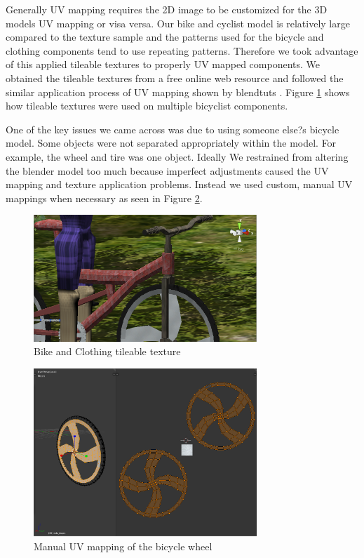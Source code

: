 \documentclass{scrartcl}
\begin{document}
Generally UV mapping requires the 2D image to be customized for the 3D models UV mapping or visa versa.  Our bike and cyclist model is relatively large compared to the texture sample and the patterns used for the bicycle and clothing components tend to use repeating patterns.  Therefore we took advantage of this applied tileable textures to properly UV mapped components.  We obtained the tileable textures from a free online web resource and followed the similar application process of UV mapping shown by blendtuts \citep{BlendTuts}.  Figure \ref{fig:bikebody} shows how tileable textures were used on multiple bicyclist components.

One of the key issues we came across was due to using someone else?s bicycle model.  Some objects were not separated appropriately within the model.  For example,  the wheel and tire was one object.  Ideally  We restrained from altering the blender model too much because imperfect adjustments caused the UV mapping and texture application problems.  Instead we used custom, manual UV mappings when necessary as seen in Figure \ref{fig:uv_map_wheel}.

\begin{figure}[h]
    \centering
    \includegraphics[width=0.75\textwidth]{tileable_bikebody.png}
    \caption{Bike and Clothing tileable texture}
    \label{fig:bikebody}
\end{figure}

\begin{figure}[h]
    \centering
    \includegraphics[width=0.75\textwidth]{uv_map_wheel.png}
    \caption{Manual UV mapping of the bicycle wheel}
    \label{fig:uv_map_wheel}
\end{figure}
\end{document}

